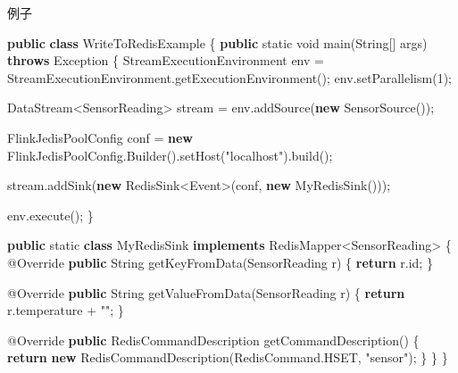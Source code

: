 \documentclass[cn,11pt,chinese]{elegantbook}
\newenvironment{Shaded}{}{}
\newcommand{\AttributeTok}[1]{\textcolor[rgb]{0.49,0.56,0.16}{#1}}
\newcommand{\BuiltInTok}[1]{#1}
\newcommand{\DataTypeTok}[1]{\textcolor[rgb]{0.56,0.13,0.00}{#1}}
\newcommand{\DecValTok}[1]{\textcolor[rgb]{0.25,0.63,0.44}{#1}}
\newcommand{\FunctionTok}[1]{\textcolor[rgb]{0.02,0.16,0.49}{#1}}
\newcommand{\KeywordTok}[1]{\textcolor[rgb]{0.00,0.44,0.13}{\textbf{#1}}}
\newcommand{\NormalTok}[1]{#1}
\newcommand{\StringTok}[1]{\textcolor[rgb]{0.25,0.44,0.63}{#1}}
\begin{document}
例子

\begin{Shaded}
\begin{Highlighting}[]
\KeywordTok{public} \KeywordTok{class}\NormalTok{ WriteToRedisExample \{}
    \KeywordTok{public} \DataTypeTok{static} \DataTypeTok{void} \FunctionTok{main}\NormalTok{(}\BuiltInTok{String}\NormalTok{[] args) }\KeywordTok{throws} \BuiltInTok{Exception}\NormalTok{ \{}
\NormalTok{        StreamExecutionEnvironment env = StreamExecutionEnvironment.}\FunctionTok{getExecutionEnvironment}\NormalTok{();}
\NormalTok{        env.}\FunctionTok{setParallelism}\NormalTok{(}\DecValTok{1}\NormalTok{);}

\NormalTok{        DataStream\textless{}SensorReading\textgreater{} stream = env.}\FunctionTok{addSource}\NormalTok{(}\KeywordTok{new} \FunctionTok{SensorSource}\NormalTok{());}

\NormalTok{        FlinkJedisPoolConfig conf = }\KeywordTok{new}\NormalTok{ FlinkJedisPoolConfig.}\FunctionTok{Builder}\NormalTok{().}\FunctionTok{setHost}\NormalTok{(}\StringTok{"localhost"}\NormalTok{).}\FunctionTok{build}\NormalTok{();}

\NormalTok{        stream.}\FunctionTok{addSink}\NormalTok{(}\KeywordTok{new}\NormalTok{ RedisSink\textless{}}\BuiltInTok{Event}\NormalTok{\textgreater{}(conf, }\KeywordTok{new} \FunctionTok{MyRedisSink}\NormalTok{()));}

\NormalTok{        env.}\FunctionTok{execute}\NormalTok{();}
\NormalTok{    \}}

    \KeywordTok{public} \DataTypeTok{static} \KeywordTok{class}\NormalTok{ MyRedisSink }\KeywordTok{implements}\NormalTok{ RedisMapper\textless{}SensorReading\textgreater{} \{}
        \AttributeTok{@Override}
        \KeywordTok{public} \BuiltInTok{String} \FunctionTok{getKeyFromData}\NormalTok{(SensorReading r) \{}
            \KeywordTok{return}\NormalTok{ r.}\FunctionTok{id}\NormalTok{;}
\NormalTok{        \}}

        \AttributeTok{@Override}
        \KeywordTok{public} \BuiltInTok{String} \FunctionTok{getValueFromData}\NormalTok{(SensorReading r) \{}
            \KeywordTok{return}\NormalTok{ r.}\FunctionTok{temperature}\NormalTok{ + }\StringTok{""}\NormalTok{;}
\NormalTok{        \}}

        \AttributeTok{@Override}
        \KeywordTok{public}\NormalTok{ RedisCommandDescription }\FunctionTok{getCommandDescription}\NormalTok{() \{}
            \KeywordTok{return} \KeywordTok{new} \FunctionTok{RedisCommandDescription}\NormalTok{(RedisCommand.}\FunctionTok{HSET}\NormalTok{, }\StringTok{"sensor"}\NormalTok{);}
\NormalTok{        \}}
\NormalTok{    \}}
\NormalTok{\}}
\end{Highlighting}
\end{Shaded}
\end{document}
